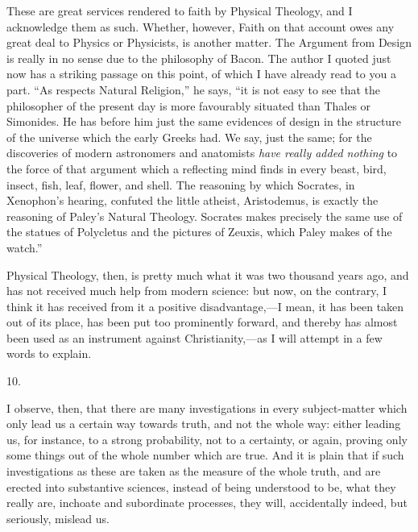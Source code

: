 These are great services rendered to faith by Physical Theology,
and I acknowledge them as such. Whether, however, Faith on that
account owes any great deal to Physics or Physicists, is another
matter. The Argument from Design is really in no sense due to the
philosophy of Bacon. The author I quoted just now has a striking
passage on this point, of which I have already read to you a part.
``As respects Natural Religion,'' he says, ``it is not
easy to see that the philosopher of the present day is more favourably
situated than Thales or Simonides. He has before him just the same
evidences of design in the structure of the universe which the early
Greeks had. We say, just the same; for the discoveries of modern
astronomers and anatomists \emph{have really added nothing} to the
force of that argument which a reflecting mind finds in every beast,
bird, insect, fish, leaf, flower, and shell. The reasoning by which
Socrates, in Xenophon's hearing, confuted the little atheist,
Aristodemus, is exactly the reasoning of Paley's Natural Theology.
Socrates makes precisely the same use of the statues of Polycletus and
the pictures of Zeuxis, which Paley makes of the watch.''

Physical Theology, then, is pretty much what it was two
thousand years ago, and has not received much help from modern
science: but now, on the contrary, I think it has received from it a
positive disadvantage,—I mean, it has been taken out of its place,
has been put too prominently forward, and thereby has almost been used
as an instrument against Christianity,—as I will attempt in a few
words to explain.

10.

I observe, then, that there are many investigations in every
subject-matter which only lead us a certain way towards truth, and not
the whole way: either leading us, for instance, to a strong
probability, not to a certainty, or again, proving only some things
out of the whole number which are true. And it is plain that if such
investigations as these are taken as the measure of the whole truth,
and are erected into substantive sciences, instead of being understood
to be, what they really are, inchoate and subordinate processes, they
will, accidentally indeed, but seriously, mislead us.

